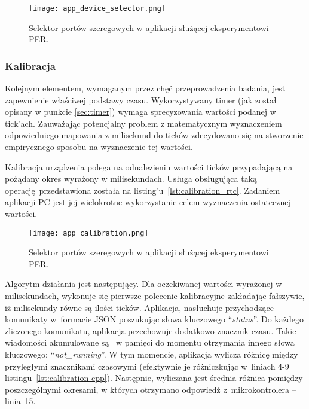 \begin{figure}[!ht]
	\centering \texttt{[image: app\_device\_selector.png]}
	\caption{Selektor portów szeregowych w aplikacji służącej eksperymentowi PER.}
	\label{app_device_selector}
\end{figure}


\subsubsection{Kalibracja}
Kolejnym elementem, wymaganym przez chęć przeprowadzenia badania, jest zapewnienie
właściwej podstawy czasu. Wykorzystywany timer (jak został opisany w punkcie \ref{sec:timer})
wymaga sprecyzowania wartości podanej w tick'ach. Zauważając potencjalny problem
z matematycznym wyznaczeniem odpowiedniego mapowania z milisekund do ticków
zdecydowano się na stworzenie empirycznego sposobu na wyznaczenie tej wartości.

Kalibracja urządzenia polega na odnalezieniu wartości ticków przypadającą na pożądany okres
wyrażony w milisekundach. Usługa obsługująca taką operację przedstawiona została
na listing'u~\ref{lst:calibration_rtc}. Zadaniem aplikacji PC jest jej wielokrotne
wykorzystanie celem wyznaczenia ostatecznej wartości.

\begin{figure}[!ht]
	\centering \texttt{[image: app\_calibration.png]}
	\caption{Selektor portów szeregowych w aplikacji służącej eksperymentowi PER.}
	\label{app_calibration}
\end{figure}

Algorytm działania jest następujący. Dla oczekiwanej wartości wyrażonej w milisekundach,
wykonuje się pierwsze polecenie kalibracyjne zakładając fałszywie, iż milisekundy
równe są ilości ticków. Aplikacja, nasłuchuje przychodzące komunikaty w~formacie JSON
poszukując słowa kluczowego \enquote{\textit{status}}. Do każdego zliczonego komunikatu,
aplikacja przechowuje dodatkowo znacznik czasu. Takie wiadomości akumulowane są 
w pamięci do momentu otrzymania innego słowa kluczowego: \enquote{\textit{not\_running}}. W tym momencie,
aplikacja wylicza różnicę między przyległymi znacznikami czasowymi (efektywnie je różniczkując
w~liniach 4-9 listingu~\ref{lst:calibration-cpp}). Następnie, wyliczana jest
średnia różnica pomiędzy poszczególnymi okresami, w których otrzymano odpowiedź 
z~mikrokontrolera -- linia~15.

